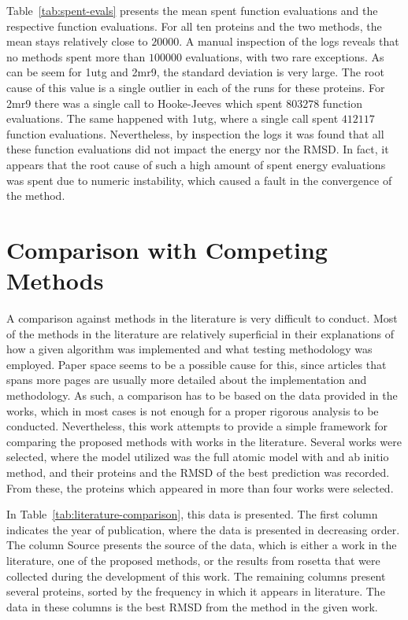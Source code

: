 Table~\ref{tab:spent-evals} presents the mean spent function evaluations and
the respective function evaluations. For all ten proteins and the two methods,
the mean stays relatively close to $20000$. A manual inspection of the logs
reveals that no methods spent more than $100000$ evaluations, with two rare
exceptions. As can be seem for 1utg and 2mr9, the standard deviation is very
large. The root cause of this value is a single outlier in each of the runs
for these proteins. For 2mr9 there was a single call to Hooke-Jeeves which spent
$803278$ function evaluations. The same happened with 1utg, where a single call
spent $412117$ function evaluations. Nevertheless, by inspection the logs it
was found that all these function evaluations did not impact the energy nor the
RMSD. In fact, it appears that the root cause of such a high amount of
spent energy evaluations was spent due to numeric instability, which caused
a fault in the convergence of the method.

\section{Comparison with Competing Methods}
\label{sec:competing-methods}

A comparison against methods in the literature is very difficult to conduct.
Most of the methods in the literature are relatively superficial in their
explanations of how a given algorithm was implemented and what testing
methodology was employed. Paper space seems to be a possible cause for this,
since articles that spans more pages are usually more detailed about the
implementation and methodology. As such, a comparison has to be based on the
data provided in the works, which in most cases is not enough for a proper
rigorous analysis to be conducted. Nevertheless, this work attempts to provide
a simple framework for comparing the proposed methods with works in the
literature. Several works were selected, where the model utilized was the
full atomic model with and ab initio method, and their proteins and the RMSD
of the best prediction was recorded. From these, the proteins which appeared in
more than four works were selected.



In Table~\ref{tab:literature-comparison}, this data is presented. The first
column indicates the year of publication, where the data is presented in
decreasing order. The column Source presents the source of the data, which is
either a work in the literature, one of the proposed methods, or the results
from rosetta that were collected during the development of this work. The
remaining columns present several proteins, sorted by the frequency in which it
appears in literature. The data in these columns is the best RMSD from the
method in the given work.

